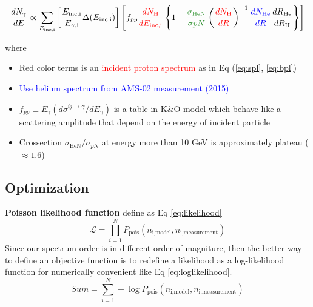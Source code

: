 \begin{equation}
    \frac{dN_{\gamma}}{dE} \propto \sum_{E_{\text{inc,i}}}\left[\frac{E_{\text{inc,i}}}{E_{\gamma\text{,i}}}\Delta(E_{\text{inc,i}}) \right]\left[ f_{pp}\textcolor{red}{\frac{dN_\text{H}}{dE_{\text{inc,i}}}}\left\{ 1+\textcolor{olivegreen}{\frac{\sigma_{\text{HeN}}}{\sigma{pN}}}\left(\textcolor{red}{\frac{dN_{\text{H}}}{dR}}\right)^{-1} \textcolor{blue}{\frac{dN_{\text{He}}}{dR}} \frac{dR_{\text{He}}}{dR_{\text{H}}}  \right\}\right]
\end{equation}

where
\begin{itemize}
    \item Red color terms is an \textcolor{red}{incident proton spectrum} as in Eq (\ref{eq:spl}, \ref{eq:bpl})
    \item \textcolor{blue}{Use helium spectrum from AMS-02 measurement (2015)}
    \item $f_{pp}\equiv E_\gamma(d\sigma^{ij\rightarrow\gamma}/dE_\gamma)$ is a table in K$\&$O model which behave like a scattering amplitude
    that depend on the energy of incident particle
    \item Crossection \textcolor{olivegreen}{$\sigma_{\text{HeN}}/\sigma_{pN}$} at energy more than 10 GeV is approximately plateau ($\approx 1.6$)
\end{itemize}



\subsection{Optimization}

\par \textbf{Poisson likelihood function} define as Eq \ref{eq:likelihood}
\begin{equation}
    \mathcal{L} = \prod_{i=1}^{N} P_{\text{pois}}(n_{\text{i,model}}, n_{\text{i,measurement}})
    \label{eq:likelihood}
\end{equation}
Since our spectrum order is in different order of magniture, then the better way to define an objective function is to redefine a likelihood as a log-likelihood function for numerically convenient like Eq \ref{eq:loglikelihood}. 
\begin{equation}
    Sum = \sum_{i=1}^{N} -\log P_{\text{pois}}(n_{\text{i,model}}, n_{\text{i,measurement}})
    \label{eq:loglikelihood}
\end{equation}


